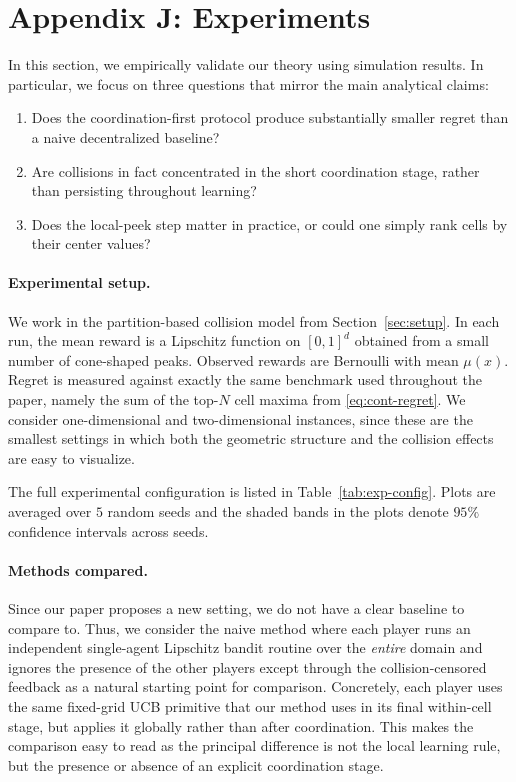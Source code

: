 \section*{Appendix J: Experiments}
\label{app:experiments}

In this section, we empirically validate our theory using simulation results. In particular, we focus on three questions that mirror the main analytical claims:
\begin{enumerate}
    \item Does the coordination-first protocol produce substantially smaller regret than a naive decentralized baseline?
    \item Are collisions in fact concentrated in the short coordination stage, rather than persisting throughout learning?
    \item Does the local-peek step matter in practice, or could one simply rank cells by their center values?
\end{enumerate}

\paragraph{Experimental setup.}
We work in the partition-based collision model from Section~\ref{sec:setup}. In each run, the mean reward is a Lipschitz function on $[0,1]^d$ obtained from a small number of cone-shaped peaks. Observed rewards are Bernoulli with mean $\mu(x)$. Regret is measured against exactly the same benchmark used throughout the paper, namely the sum of the top-$N$ cell maxima from \eqref{eq:cont-regret}. We consider one-dimensional and two-dimensional instances, since these are the smallest settings in which both the geometric structure and the collision effects are easy to visualize.

The full experimental configuration is listed in Table~\ref{tab:exp-config}. Plots are averaged over $5$ random seeds and the shaded bands in the plots denote $95\%$ confidence intervals across seeds.

\paragraph{Methods compared.}
Since our paper proposes a new setting, we do not have a clear baseline to compare to. Thus, we consider the naive method where each player runs an independent single-agent Lipschitz bandit routine over the \emph{entire} domain and ignores the presence of the other players except through the collision-censored feedback as a natural starting point for comparison. Concretely, each player uses the same fixed-grid UCB primitive that our method uses in its final within-cell stage, but applies it globally rather than after coordination. This makes the comparison easy to read as the principal difference is not the local learning rule, but the presence or absence of an explicit coordination stage.


